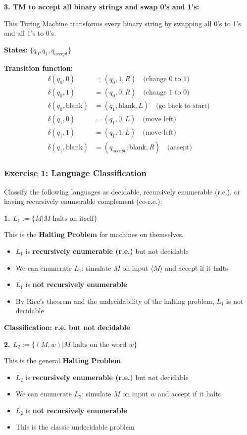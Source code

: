 \documentclass{article}
\begin{document}
\textbf{3. TM to accept all binary strings and swap 0's and 1's:}

This Turing Machine transforms every binary string by swapping all 0's to 1's and all 1's to 0's.

\textbf{States:} $\{q_0, q_1, q_{accept}\}$

\textbf{Transition function:}
\begin{align}
\delta(q_0, 0) &= (q_0, 1, R) \quad \text{(change 0 to 1)} \\
\delta(q_0, 1) &= (q_0, 0, R) \quad \text{(change 1 to 0)} \\
\delta(q_0, \text{blank}) &= (q_1, \text{blank}, L) \quad \text{(go back to start)} \\
\delta(q_1, 0) &= (q_1, 0, L) \quad \text{(move left)} \\
\delta(q_1, 1) &= (q_1, 1, L) \quad \text{(move left)} \\
\delta(q_1, \text{blank}) &= (q_{accept}, \text{blank}, R) \quad \text{(accept)}
\end{align}

\subsubsection{Exercise 1: Language Classification}

Classify the following languages as decidable, recursively enumerable (r.e.), or having recursively enumerable complement (co-r.e.):

\textbf{1. $L_1 := \{M | M \text{ halts on itself}\}$}

This is the \textbf{Halting Problem} for machines on themselves.
\begin{itemize}
\item $L_1$ is \textbf{recursively enumerable (r.e.)} but not decidable
\item We can enumerate $L_1$: simulate $M$ on input $\langle M \rangle$ and accept if it halts
\item $\overline{L_1}$ is \textbf{not recursively enumerable}
\item By Rice's theorem and the undecidability of the halting problem, $L_1$ is not decidable
\end{itemize}

\textbf{Classification: r.e. but not decidable}

\textbf{2. $L_2 := \{(M,w) | M \text{ halts on the word } w\}$}

This is the general \textbf{Halting Problem}.
\begin{itemize}
\item $L_2$ is \textbf{recursively enumerable (r.e.)} but not decidable
\item We can enumerate $L_2$: simulate $M$ on input $w$ and accept if it halts
\item $\overline{L_2}$ is \textbf{not recursively enumerable}
\item This is the classic undecidable problem
\end{itemize}
\end{document}
